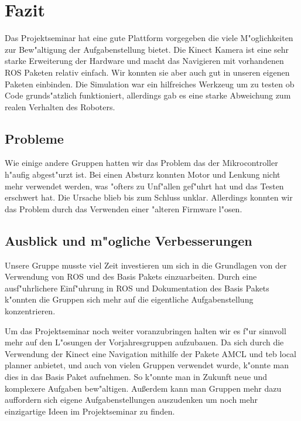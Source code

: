 \section{Fazit}

Das Projektseminar hat eine gute Plattform vorgegeben die viele M"oglichkeiten zur Bew"altigung der Aufgabenstellung 
bietet. Die Kinect Kamera ist eine sehr
starke Erweiterung der Hardware und macht das Navigieren mit vorhandenen ROS Paketen relativ einfach.
Wir konnten sie aber auch gut in unseren eigenen Paketen einbinden. Die Simulation war ein hilfreiches Werkzeug um zu testen ob Code grunds"atzlich funktioniert, allerdings gab es eine starke Abweichung zum realen Verhalten des Roboters.		

 

\subsection{Probleme}

Wie einige andere Gruppen hatten wir das Problem das der Mikrocontroller h"aufig abgest"urzt ist. Bei einen Absturz konnten Motor und Lenkung nicht mehr verwendet werden, was "ofters zu Unf"allen gef"uhrt hat und das Testen erschwert hat.
Die Ursache blieb bis zum Schluss unklar. Allerdings konnten wir das Problem durch das Verwenden einer "alteren Firmware l"osen.



\subsection{Ausblick und m"ogliche Verbesserungen}

Unsere Gruppe musste viel Zeit investieren um sich in die Grundlagen von der Verwendung von ROS und des Basis Pakets einzuarbeiten. 
Durch eine ausf"uhrlichere Einf"uhrung in ROS und Dokumentation des Basis Pakets k"onnten die Gruppen sich mehr auf die eigentliche Aufgabenstellung
konzentrieren.

Um das Projektseminar noch weiter voranzubringen halten wir es f"ur sinnvoll mehr auf den L"osungen der Vorjahresgruppen aufzubauen.
Da sich durch die Verwendung der Kinect eine Navigation mithilfe der Pakete AMCL und teb local planner anbietet, und auch von vielen Gruppen verwendet wurde,
k"onnte man dies in das Basis Paket aufnehmen. So k"onnte man in Zukunft neue und komplexere Aufgaben bew"altigen.
Au{\ss}erdem kann man Gruppen mehr dazu auffordern sich eigene Aufgabenstellungen auszudenken um noch mehr einzigartige Ideen im Projektseminar zu finden.
